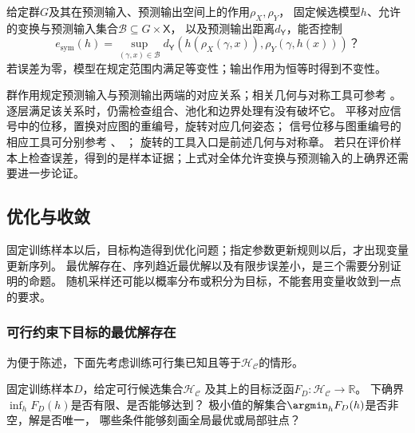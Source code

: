 \begin{mathproblem}[预测输入变换与预测输出对应的误差]
  \label{question:future-structural-property}
  给定群$G$及其在预测输入、预测输出空间上的作用$\rho_X,\rho_Y$，
  固定候选模型$h$、允许的变换与预测输入集合$\mathcal B\subseteq G\times\mathsf X$，
  以及预测输出距离$d_{\mathsf Y}$，能否控制
  \[
    e_{\mathrm{sym}}(h)=\sup_{(\gamma,x)\in\mathcal B}
    d_{\mathsf Y}\!\left(h(\rho_X(\gamma,x)),\rho_Y(\gamma,h(x))\right)\text{？}
  \]
  若误差为零，模型在规定范围内满足等变性；输出作用为恒等时得到不变性。
\end{mathproblem}

群作用规定预测输入与预测输出两端的对应关系；相关几何与对称工具可参考
。
逐层满足该关系时，仍需检查组合、池化和边界处理有没有破坏它。
平移对应信号中的位移，置换对应图的重编号，旋转对应几何姿态；
信号位移与图重编号的相应工具可分别参考
、
；
旋转的工具入口是前述几何与对称章。
若只在评价样本上检查误差，得到的是样本证据；上式对全体允许变换与预测输入的上确界还需要进一步论证。

\subsection{优化与收敛}
\label{sec:future-objective-object-map}
\label{sec:future-iteration-object-map}

固定训练样本以后，目标构造得到优化问题；指定参数更新规则以后，才出现变量更新序列。
最优解存在、序列趋近最优解以及有限步误差小，是三个需要分别证明的命题。
随机采样还可能以概率分布或积分为目标，不能套用变量收敛到一点的要求。

\subsubsection{可行约束下目标的最优解存在}
\label{sec:future-analysis-minimizer}

为便于陈述，下面先考虑训练可行集已知且等于$\mathcal H_{\mathcal C}$的情形。

\begin{mathproblem}[目标泛函的极小值与解]
  \label{question:future-minimizer}
  固定训练样本$D$，给定可行候选集合$\mathcal H_{\mathcal C}$
  及其上的目标泛函$F_D:\mathcal H_{\mathcal C}\to\mathbb R$。
  下确界$\inf_hF_D(h)$是否有限、是否能够达到？
  极小值的解集合$\argmin_hF_D(h)$是否非空，解是否唯一，
  哪些条件能够刻画全局最优或局部驻点？
\end{mathproblem}

